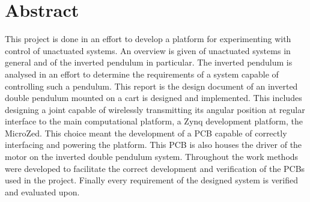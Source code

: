 \section*{Abstract}
This project is done in an effort to develop a platform for experimenting with control of unactuated systems.
An overview is given of unactuated systems in general and of the inverted pendulum in particular.
The inverted pendulum is analysed in an effort to determine the requirements of a system capable of controlling such a pendulum.
This report is the design document of an inverted double pendulum mounted on a cart is designed and implemented.
This includes designing a joint capable of wirelessly transmitting its angular position at regular interface to the main computational platform, a Zynq development platform, the MicroZed.
This choice meant the development of a PCB capable of correctly interfacing and powering the platform.
This PCB is also houses the driver of the motor on the inverted double pendulum system.
Throughout the work methods were developed to facilitate the correct development and verification of the PCBs used in the project.
Finally every requirement of the designed system is verified and evaluated upon.
